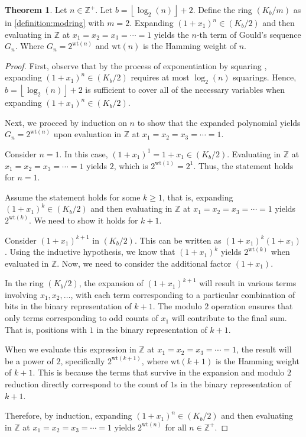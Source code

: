 \documentclass{article}
\theoremstyle{plain}
\theoremstyle{definition}
\newtheorem{theorem}{Theorem}
\newcommand{\floor}[1]{\left\lfloor #1 \right\rfloor}
\newcommand{\Z}{\mathbb{Z}}
\newcommand{\K}{K}
\newcommand{\wt}[1]{\text{wt}(#1)}
\begin{document}
\begin{theorem}
\label{theorem:goulds}
Let $n \in \Z^+$. Let $b={\floor{\log_2(n)}+2}$. Define the ring $(\K_b/m)$ as in \cref{definition:modring} with $m=2$. Expanding $(1+x_1)^n \in (\K_b/2)$ and then evaluating in $\Z$ at $x_1=x_2=x_3=\cdots=1$ yields the $n$-th term of Gould's sequence $G_n$. Where $G_n = 2^{\wt{n}}$ and $\wt{n}$ is the Hamming weight of $n$.
\end{theorem}
\begin{proof}
First, observe that by the process of exponentiation by squaring \cite{knuth1997art}, expanding $(1+x_1)^n \in (\K_b/2)$ requires at most $\log_2(n)$ squarings. Hence, $b={\floor{\log_2(n)}+2}$ is sufficient to cover all of the necessary variables when expanding $(1+x_1)^n \in (\K_b/2)$.

Next, we proceed by induction on $n$ to show that the expanded polynomial yields $G_n = 2^{\wt{n}}$ upon evaluation in $\Z$ at $x_1 = x_2 = x_3 = \cdots = 1$.

Consider $n = 1$. In this case, $(1 + x_1)^1 = 1 + x_1 \in (\K_b/2)$. Evaluating in $\Z$ at $x_1 = x_2 = x_3 = \cdots = 1$ yields $2$, which is $2^{\wt{1}} = 2^1$. Thus, the statement holds for $n = 1$.

Assume the statement holds for some $k \geq 1$, that is, expanding $(1 + x_1)^k \in (\K_b/2)$ and then evaluating in $\Z$ at $x_1 = x_2 = x_3 = \cdots = 1$ yields $2^{\wt{k}}$. We need to show it holds for $k+1$.

Consider $(1 + x_1)^{k+1}$ in $(\K_b/2)$. This can be written as $(1 + x_1)^k (1 + x_1)$. Using the inductive hypothesis, we know that $(1 + x_1)^k$ yields $2^{\wt{k}}$ when evaluated in $\Z$. Now, we need to consider the additional factor $(1 + x_1)$.

In the ring $(\K_b/2)$, the expansion of $(1 + x_1)^{k+1}$ will result in various terms involving $x_1, x_2, \ldots$, with each term corresponding to a particular combination of bits in the binary representation of $k+1$. The modulo $2$ operation ensures that only terms corresponding to odd counts of $x_1$ will contribute to the final sum. That is, positions with $1$ in the binary representation of $k+1$.

When we evaluate this expression in $\Z$ at $x_1 = x_2 = x_3 = \cdots = 1$, the result will be a power of $2$, specifically $2^{\wt{k+1}}$, where $\wt{k+1}$ is the Hamming weight of $k+1$. This is because the terms that survive in the expansion and modulo $2$ reduction directly correspond to the count of $1$s in the binary representation of $k+1$.

Therefore, by induction, expanding $(1 + x_1)^n \in (\K_b/2)$ and then evaluating in $\Z$ at $ x_1 = x_2 = x_3 = \cdots = 1$ yields $2^{\wt{n}}$ for all $n \in \Z^+$.
\end{proof}
\end{document}
